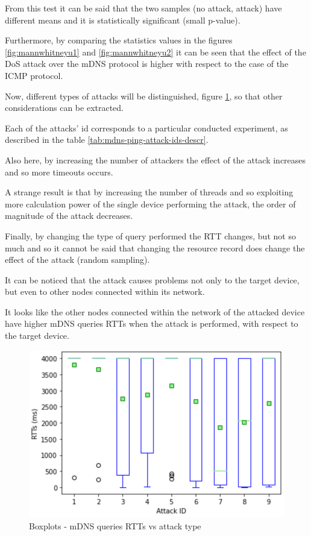 \documentclass[fleqn, 11pt]{SelfArx} %
\begin{document}
From this test it can be said that the two samples (no attack, attack) have different means and it is statistically significant (small p-value).

Furthermore, by comparing the statistics values in the figures \ref{fig:mannwhitneyu1} and \ref{fig:mannwhitneyu2} it can be seen that the effect of the DoS attack over the mDNS protocol is higher with respect to the case of the ICMP protocol. \newline

Now, different types of attacks will be distinguished, figure \ref{fig:mdns-boxplot2}, so that other considerations can be extracted.

Each of the attacks' id corresponds to a particular conducted experiment, as described in the table \ref{tab:mdns-ping-attack-ids-descr}.

Also here, by increasing the number of attackers the effect of the attack increases and so more timeouts occurs.

A strange result is that by increasing the number of threads and so exploiting more calculation power of the single device performing the attack, the order of magnitude of the attack decreases. \newline

Finally, by changing the type of query performed the RTT changes, but not so much and so it cannot be said that changing the resource record does change the effect of the attack (random sampling).

It can be noticed that the attack causes problems not only to the target device, but even to other nodes connected within its network.

It looks like the other nodes connected within the network of the attacked device have higher mDNS queries RTTs when the attack is performed, with respect to the target device.

\begin{figure}[H]
	\centering
    \includegraphics[width=\linewidth]{./mdns/mdns-boxplot2.png}
    \caption{Boxplots - mDNS queries RTTs vs attack type}
	\label{fig:mdns-boxplot2}
\end{figure}
\end{document}

